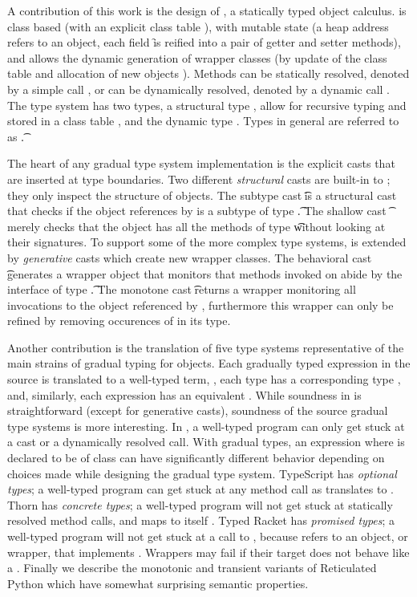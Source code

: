 \documentclass[a4paper,USenglish]{tex/lipics-v2016}
\renewcommand{\u}[1]{\underline{#1}\xspace}
\begin{document}
A contribution of this work is the design of \kafka, a statically typed object
calculus.  \kafka is class based (with an explicit class table \K), with mutable
state (a heap address \a refers to an object, each field \f is reified into a
pair of getter and setter methods), and allows the dynamic generation of wrapper
classes (by update of the class table \K and allocation of new objects \a).
Methods can be statically resolved, denoted by a simple call \Call\a\m\x, or can
be dynamically resolved, denoted by a dynamic call \DynCall\a\m\x. The \kafka
type system has two types, a structural type \C, allow for recursive typing 
and stored in a class table \K, and the dynamic
type \any. Types in general are referred to as \t.

The heart of any gradual type system implementation is the explicit casts
that are inserted at type boundaries.  Two different \emph{structural} casts
are built-in to \kafka; they only inspect the structure of objects.  The
subtype cast \SubCast\t\a is a structural cast that checks if the object
references by \a is a subtype of type \t. The shallow cast \ShaCast\t\a
merely checks that the object has all the methods of type \t without looking
at their signatures.  To support some of the more complex type systems,
\kafka is extended by \emph{generative} casts which create new wrapper
classes.  The behavioral cast \BehCast\t\a generates a wrapper object that
monitors that methods invoked on \a abide by the interface of type \t. The
monotone cast \MonCast\t\a returns a wrapper monitoring all invocations to
the object referenced by \a, furthermore this wrapper can only be refined by
removing occurences of \any in its type.

Another contribution is the translation of five type systems representative
of the main strains of gradual typing for objects. Each gradually typed
expression \HT{\u\e}{\u\T} in the source is translated to a well-typed
\kafka term, \HT\e\T, each type \u\T has a corresponding \kafka type \T,
and, similarly, each expression \u\e has an equivalent \e. While soundness
in \kafka is straightforward (except for generative casts), soundness of the
source gradual type systems is more interesting.  In \kafka, a well-typed
program can only get stuck at a cast or a dynamically resolved call.  With
gradual types, an expression \Call{\u\x}\m{\u{\x'}} where \u\x is declared
to be of class \u\C can have significantly different behavior depending on
choices made while designing the gradual type system. TypeScript has
\emph{optional types}; a well-typed program can get stuck at any method call
as \u\C translates to \any. Thorn has \emph{concrete types}; a well-typed
program will not get stuck at statically resolved method calls, and \u\C
maps to itself \C. Typed Racket has \emph{promised types}; a well-typed
program will not get stuck at a call to \m, because \u\x refers to an
object, or wrapper, that implements \m.  Wrappers may fail if their target
does not behave like a \u\C. Finally we describe the monotonic
and transient variants of Reticulated Python which have somewhat surprising
semantic properties.
\end{document}
